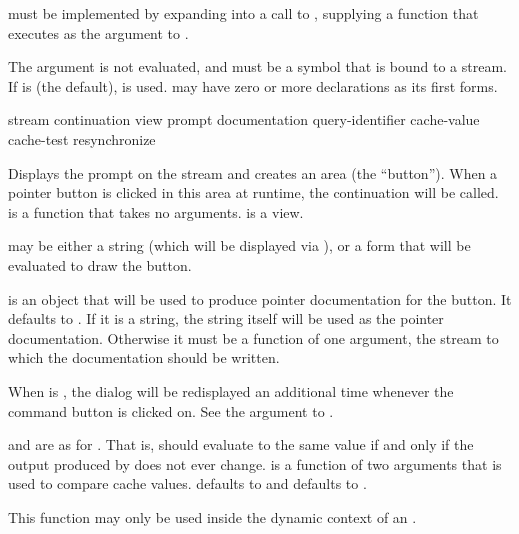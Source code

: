  must be implemented by expanding into a call
to , supplying a function that executes
 as the  argument to .

The  argument is not evaluated, and must be a symbol that is bound
to a stream.  If  is  (the default),  is
used.   may have zero or more declarations as its first forms.

           {stream continuation view prompt
            \key documentation query-identifier cache-value cache-test resynchronize}

Displays the prompt  on the stream  and creates an area
(the ``button'').  When a pointer button is clicked in this area at runtime, the
continuation will be called.   is a function that takes no
arguments.   is a view.

 may be either a string (which will be displayed via
), or a form that will be evaluated to draw the button.

 is an object that will be used to produce pointer
documentation for the button.  It defaults to .  If it is a string,
the string itself will be used as the pointer documentation.  Otherwise it must
be a function of one argument, the stream to which the documentation should be
written.

When  is , the dialog will be redisplayed an
additional time whenever the command button is clicked on.  See the
 argument to .
 
 and  are as for .  That
is,  should evaluate to the same value if and only if the
output produced by  does not ever change.   is a
function of two arguments that is used to compare cache values.
 defaults to  and  defaults to .

This function may only be used inside the dynamic context of an
.
